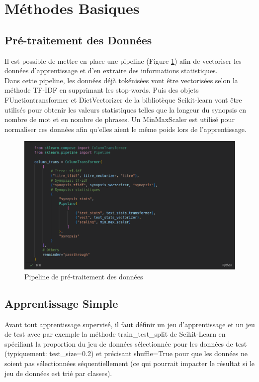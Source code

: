 \section{Méthodes Basiques}

\subsection{Pré-traitement des Données}
Il est possible de mettre en place une pipeline (Figure \ref{pipeline_1}) afin de vectoriser les données d'apprentissage et d'en extraire des informations statistiques.\\
Dans cette pipeline, les données déjà tokénisées vont être vectorisées selon la méthode TF-IDF en supprimant les stop-words. Puis des objets \textsf{FUnctiontransformer} et \textsf{DictVectorizer} de la bibliotèque Scikit-learn \cite{scikit_learn} vont être utilisés pour obtenir les valeurs statistiques telles que la longeur du synopsis en nombre de mot et en nombre de phrases. Un \textsf{MinMaxScaler} est utilisé pour normaliser ces données afin qu'elles aient le même poids lors de l'apprentissage.

\begin{figure}
    \center
    \includegraphics[scale=.3]{img/pipeline_1.png}
    \caption{Pipeline de pré-traitement des données}
    \label{pipeline_1}
\end{figure}

\subsection{Apprentissage Simple}
Avant tout apprentissage supervisé, il faut définir un jeu d'apprentissage et un jeu de test avec par exemple la méthode \textsf{train\_test\_split} de Scikit-Learn en spécifiant la proportion du jeu de données sélectionnée pour les données de test (typiquement: \textsf{test\_size=0.2}) et précisant \textsf{shuffle=True} pour que les données ne soient pas sélectionnées séquentiellement (ce qui pourrait impacter le résultat si le jeu de données est trié par classes).

